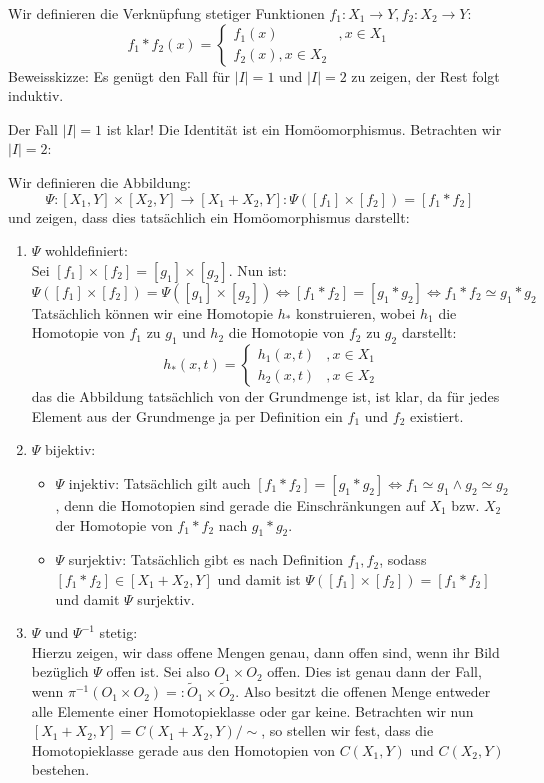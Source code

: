 \documentclass{scrartcl}
\begin{document}
\setcounter{section}{9}
\setcounter{aufgabe}{1}
\begin{aufgabe}
Wir definieren die Verknüpfung stetiger Funktionen $ f_1: X_1\to Y, f_2: X_2 \to Y $:
\[
f_1*f_2(x)=\begin{cases} f_1(x)&, x\in X_1\\ f_2(x), x\in X_2 \end{cases}
\]
Beweisskizze:  Es genügt den Fall für $ |I|=1 $ und $ |I|=2 $ zu zeigen, der Rest folgt induktiv.

Der Fall $ |I|=1 $ ist klar!  Die Identität ist ein Homöomorphismus. Betrachten wir $ |I|=2 $:

Wir definieren die Abbildung:
\[
\Psi: [X_1, Y]\times[X_2,Y]\to [X_1+X_2, Y]: \Psi([f_1]\times[f_2])=[f_1*f_2]
\]
und zeigen, dass dies tatsächlich ein Homöomorphismus darstellt:
\begin{enumerate}
\item $ \Psi $ wohldefiniert:\\
Sei $ [f_1]\times[f_2]=[g_1]\times[g_2]$. Nun ist:
\[
\Psi([f_1]\times[f_2])=\Psi([g_1]\times[g_2]) \iff [f_1*f_2]=[g_1*g_2]\iff f_1*f_2 \simeq g_1* g_2
\]
Tatsächlich können wir eine Homotopie $ h_* $ konstruieren, wobei $ h_1 $ die Homotopie von $ f_1 $ zu $ g_1 $ und $ h_2 $ die Homotopie von $ f_2 $ zu $ g_2 $ darstellt:
\[
h_*(x,t)=\begin{cases} h_1(x,t)&, x\in X_1 \\ h_2(x,t) &, x\in X_2 \end{cases}
\]
das die Abbildung tatsächlich von der Grundmenge ist, ist klar, da für jedes Element aus der Grundmenge ja per Definition ein $ f_1 $ und $ f_2 $ existiert.
\item  $ \Psi  $ bijektiv:
\begin{itemize}
\item $ \Psi $ injektiv:
Tatsächlich gilt auch $ [f_1*f_2]=[g_1*g_2] \iff f_1 \simeq g_1 \land g_2 \simeq g_2 $, denn die Homotopien sind gerade die Einschränkungen auf $ X_1 $ bzw. $ X_2 $ der Homotopie von $ f_1*f_2 $ nach $ g_1*g_2 $.
\item $ \Psi $ surjektiv:
Tatsächlich gibt es nach Definition $ f_1, f_2 $, sodass $ [f_1*f_2]\in [X_1+X_2, Y] $ und damit ist $ \Psi([f_1]\times[f_2])=[f_1*f_2] $ und damit $ \Psi $ surjektiv.
\end{itemize}
\item $ \Psi $ und $ \Psi^{-1} $ stetig:\\
Hierzu zeigen, wir dass offene Mengen genau, dann offen sind, wenn ihr Bild bezüglich $ \Psi $ offen ist. Sei also $ O_1 \times O_2 $ offen.  Dies ist genau dann der Fall, wenn $ \pi^{-1}(O_1 \times O_2)=: \tilde O_1\times \tilde O_2 $.  Also besitzt die offenen Menge entweder alle Elemente einer Homotopieklasse oder gar keine. Betrachten wir nun $ [X_1+X_2,Y]=C(X_1+X_2,Y)/\sim $, so stellen wir fest, dass die Homotopieklasse gerade aus den Homotopien von $ C(X_1,Y) $ und $ C(X_2, Y) $ bestehen.

\end{enumerate}
\end{aufgabe}
\end{document}
